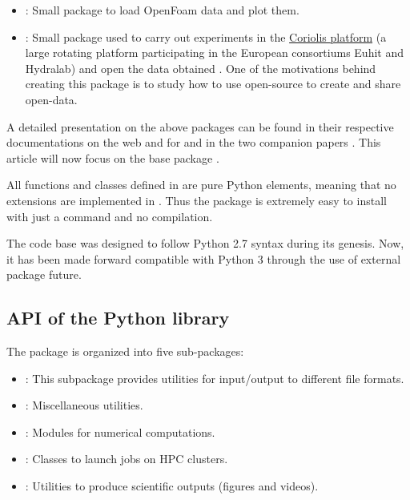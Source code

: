 \begin{itemize}
\item {}: Small package to load OpenFoam data and plot them.

\item {}: Small package used to carry out experiments in the
\href{http://www.legi.grenoble-inp.fr/web/spip.php?article757}{Coriolis platform}
(a large rotating platform participating in the European consortiums Euhit and
Hydralab) and open the data obtained \cite[see, for example,][]{ISSF2016}. One of
the motivations behind creating this package is to study how to use open-source to
create and share open-data.

\end{itemize}

A detailed presentation on the above packages can be found in their respective
documentations on the web and for  and  in the
two companion papers \cite[]{fluidfft, fluidsim}.  This article will now focus
on the base package \fluiddyn.

All functions and classes defined in \fluiddyn are pure Python elements, meaning
that no extensions are implemented in \fluiddyn.  Thus the package \fluiddyn is
extremely easy to install with just a  command and no
compilation.

The code base was designed to follow Python 2.7 syntax during its genesis. Now,
it has been made forward compatible with Python 3 through the use of external
package future.

\subsection{API of the Python library \fluiddyn}

The package \fluiddyn is organized into five sub-packages: 
\begin{itemize}
\item {}: This subpackage provides utilities for
input/output to different file formats.
\item {}: Miscellaneous utilities.
\item {}: Modules for numerical computations.
\item {}: Classes to launch jobs on HPC clusters.
\item {}: Utilities to produce scientific outputs
(figures and videos).
\end{itemize}

